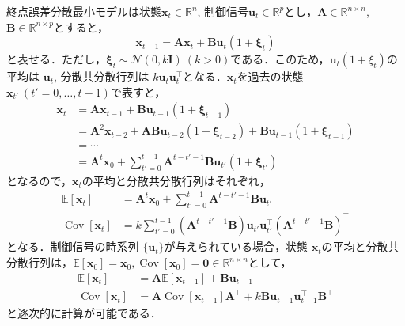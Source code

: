 \documentclass[titlepage]{ltjsbook}
\begin{document}
終点誤差分散最小モデルは状態$\mathbf{x}_t\in \mathbb{R}^n$, 制御信号$\mathbf{u}_t \in \mathbb{R}^p$とし，$\mathbf{A}\in \mathbb{R}^{n\times n}$, $\mathbf{B}\in \mathbb{R}^{n \times p}$とすると，
\begin{equation}
\mathbf{x}_{t+1} = \mathbf{A} \mathbf{x}_t + \mathbf{B}\mathbf{u}_t (1+\boldsymbol{\xi}_t)
\end{equation}
と表せる．ただし，$\boldsymbol{\xi}_t \sim \mathcal{N}(0, k\mathbf{I})\ (k>0)$である．このため，$\mathbf{u}_t (1+\xi_t)$の平均は $\mathbf{u}_t$, 分散共分散行列は $k\mathbf{u}_t \mathbf{u}_t^\top$となる．$\mathbf{x}_t$を過去の状態 $\mathbf{x}_{t'}\ (t'=0, \ldots, t-1)$で表すと，
\begin{align}
\mathbf{x}_{t} &= \mathbf{A} \mathbf{x}_{t-1} + \mathbf{B}\mathbf{u}_{t-1} (1+\boldsymbol{\xi}_{t-1})\\
&=\mathbf{A}^2 \mathbf{x}_{t-2} + \mathbf{A}\mathbf{B}\mathbf{u}_{t-2} (1+\boldsymbol{\xi}_{t-2}) + \mathbf{B}\mathbf{u}_{t-1} (1+\boldsymbol{\xi}_{t-1})\\
&=\cdots\\
&=\mathbf{A}^{t} \mathbf{x}_{0} + \sum_{t'=0}^{t-1} \mathbf{A}^{t-t'-1}\mathbf{B}\mathbf{u}_{t'} (1+\boldsymbol{\xi}_{t'})
\end{align}
となるので，$\mathbf{x}_t$の平均と分散共分散行列はそれぞれ，
\begin{align}
\mathbb{E}\left[\mathbf{x}_{t}\right]&=\mathbf{A}^{t} \mathbf{x}_{0}+\sum_{t'=0}^{t-1} \mathbf{A}^{t-t'-1} \mathbf{B} \mathbf{u}_{t'}\\
\operatorname{Cov}\left[\mathbf{x}_{t}\right]&=k\sum_{t'=0}^{t-1}\left(\mathbf{A}^{t-t'-1} \mathbf{B}\right) \mathbf{u}_{t'} \mathbf{u}_{t'}^\top \left(\mathbf{A}^{t-t'-1} \mathbf{B}\right)^{\top}
\end{align}
となる．制御信号の時系列 $\{\mathbf{u}_t\}$が与えられている場合，状態 $\mathbf{x}_t$の平均と分散共分散行列は，$\mathbb{E}\left[\mathbf{x}_{0}\right]=\mathbf{x}_0, \operatorname{Cov}\left[\mathbf{x}_{0}\right]=\mathbf{0}\in\mathbb{R}^{n\times n}$として，
\begin{align}
\mathbb{E}\left[\mathbf{x}_{t}\right] &=\mathbf{A}\mathbb{E}\left[\mathbf{x}_{t-1}\right] + \mathbf{B} \mathbf{u}_{t-1}\\
\operatorname{Cov}\left[\mathbf{x}_{t}\right]&=\mathbf{A}\operatorname{Cov}\left[\mathbf{x}_{t-1}\right]\mathbf{A}^\top + k\mathbf{B} \mathbf{u}_{t-1} \mathbf{u}_{t-1}^\top \mathbf{B}^\top
\end{align}
と逐次的に計算が可能である．
\end{document}

